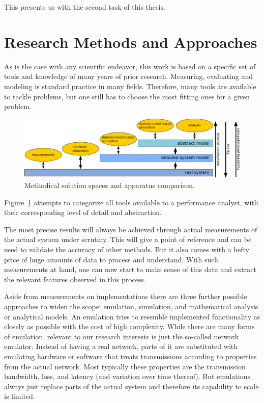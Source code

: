 This presents us with the second task of this thesis.



\section{Research Methods and Approaches}

As is the case with any scientific endeavor, this work is based on a specific set of tools and knowledge of many years of prior research. Measuring, evaluating and modeling is standard practice in many fields. Therefore, many tools  are available to tackle problems, but one still has to choose the most fitting ones for a given problem.


\begin{figure}[htbp]
    \centering
    \includegraphics[width=1.0\textwidth]{images/apparatus-new.pdf}
    \caption{Methodical solution spaces and apparatus comparison.}
    \label{c1:fig:appcomp}
\end{figure}

Figure~\ref{c1:fig:appcomp} attempts to categorize all tools available to a performance analyst, with their corresponding level of detail and abstraction.

The most precise results will always be achieved through actual measurements of the actual system under scrutiny. This will give a point of reference and can be used to validate the accuracy of other methods. But it also comes with a hefty price of huge amounts of data to process and understand. With such measurements at hand, one can now start to make sense of this data and extract the relevant features observed in this process.

Aside from measurements on implementations there are three further possible approaches to widen the scope: emulation, simulation, and mathematical analysis or analytical models.  An emulation tries to resemble implemented functionality as closely as possible with the cost of high complexity. While there are many forms of emulation, relevant to our research interests is just the so-called network emulator. Instead of having a real network, parts of it are substituted with emulating hardware or software that treats transmissions according to properties from the actual network. Most typically these properties are the transmission bandwidth, loss, and latency (and variation over time thereof).
But emulations always just replace parts of the actual system and therefore its capability to scale is limited.

